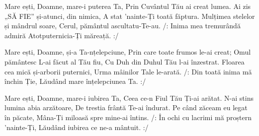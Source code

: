 \beginverse
Mare ești, Doamne, mare-i puterea Ta,
Prin Cuvântul Tău ai creat lumea.
Ai zis „SĂ FIE” și-atunci, din nimica,
A stat 'nainte-Ți toată făptura.
Mulțimea stelelor și mândrul soare,
Cerul, pământul ascultatu-Te-au.
/: Inima mea tremurândă admiră
Atotputernicia-Ți măreață. :/
\endverse

\beginverse
Mare ești, Doamne, și-a Ta-nțelepciune,
Prin care toate frumos le-ai creat;
Omul pământesc L-ai făcut al Tău fiu,
Cu Duh din Duhul Tău l-ai înzestrat.
Floarea cea mică și-arborii puternici,
Urma mâinilor Tale le-arată.
/: Din toată inima mă închin Ție,
Lăudând mare înțelepciunea Ta. :/
\endverse

\beginverse
Mare ești, Doamne, mare-i iubirea Ta,
Ceea ce-n Fiul Tău Ți-ai arătat.
N-ai stins lumina abia arzătoare,
De trestia frântă Te-ai îndurat.
Pe când zăceam eu legat în păcate,
Mâna-Ți miloasă spre mine-ai întins.
/: În ochi cu lacrimi mă proștern 'nainte-Ți,
Lăudând iubirea ce ne-a mântuit. :/
\endverse
\endsong